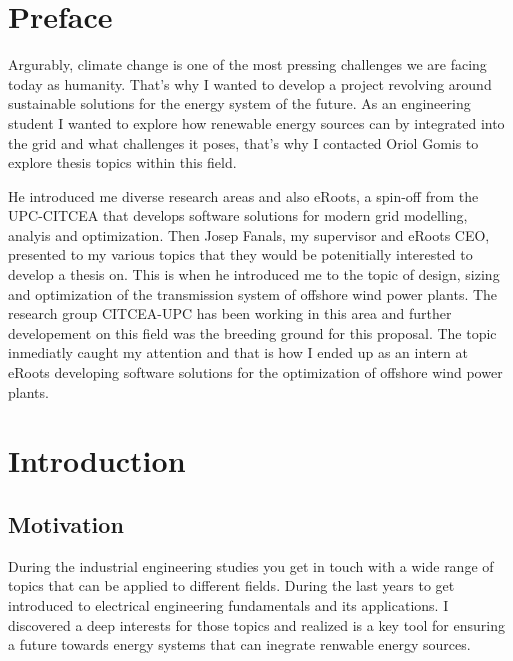 \documentclass[a4paper,11pt, titlepage, twoside]{article}
\begin{document}
\printnomenclature
\listoffigures
\listoftables




\section{Preface}

Argurably, climate change is one of the most pressing challenges we are facing today as humanity.
That's why I wanted to develop a project revolving around sustainable solutions for the 
energy system of the future. As an engineering student I wanted to explore how renewable 
energy sources can by integrated into the grid and what challenges it poses, that's why I 
contacted Oriol Gomis to explore thesis topics within this field.\par

He introduced me diverse research areas and also eRoots, a spin-off from the UPC-CITCEA
that develops software solutions for modern grid modelling, analyis and optimization. Then Josep Fanals, my supervisor
and eRoots CEO, presented to my various topics that they would be potenitially interested to develop a thesis on. This is when 
he introduced me to the topic of design, sizing and optimization of the transmission system of offshore wind power plants. The research 
group CITCEA-UPC has been working in this area \cite{paperbase} and further developement on this field was the breeding ground for this proposal.
The topic inmediatly caught my attention and that is how I ended up as an intern at eRoots developing software solutions for the optimization of offshore wind power plants.

\section{Introduction}\label{Introduction}

\subsection{Motivation}

During the industrial engineering studies you get in touch with a wide range of topics that can be applied
to different fields. During the last years to get introduced to electrical engineering fundamentals and its 
applications. I discovered a deep interests for those topics and realized is a key tool for ensuring a future towards
energy systems that can inegrate renwable energy sources.\par
\end{document}
